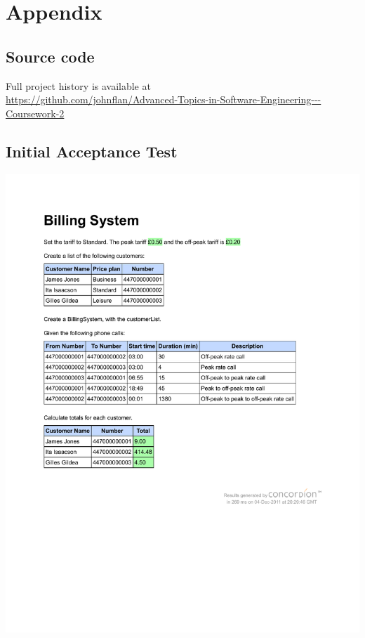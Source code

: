 \section{Appendix}

\subsection{Source code}
Full project history is available at\\
\url{https://github.com/johnflan/Advanced-Topics-in-Software-Engineering---Coursework-2}
\subsection{Initial Acceptance Test}
\begin{center}
	\includegraphics[scale=0.7]{images/InitialAcceptanceTest.pdf}
\end{center}
